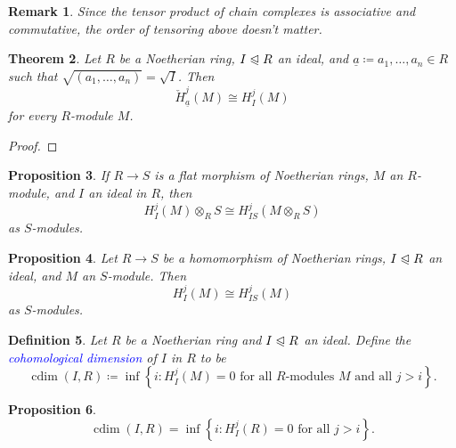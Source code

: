 \documentclass[10pt]{article}
\theoremstyle{thmstyle}
\newtheorem{theorem}{Theorem}[section]
\newtheorem{proposition}[theorem]{Proposition}
\theoremstyle{defstyle}
\newtheorem{definition}[theorem]{Definition}
\newtheorem{remark}[theorem]{Remark}
\newcommand{\define}[1]{\textcolor{blue}{\textit{#1}}}
\newcommand{\noreq}{\trianglelefteqslant}
\newcommand{\ul}[1]{\underline{#1}}
\newcommand{\cech}[1]{\mathbin{\check{#1}}}
\newcommand{\cdim}{\operatorname{cdim}}
\begin{document}
\begin{remark}
	Since the tensor product of chain complexes is associative and commutative, the order of tensoring above doesn't matter. 
\end{remark}

\begin{theorem}
	Let $R$ be a Noetherian ring, $I\noreq R$ an ideal, and $\ul a\coloneq a_1,\dots, a_n\in R$ such that $\sqrt{(a_1,\dots ,a_n)} = \sqrt I$. Then 
	\begin{equation*}
		\cech{H}^j_{\ul a}(M)\cong  H^j_I(M)
	\end{equation*}
	for every $R$-module $M$.
\end{theorem}
\begin{proof}
	
\end{proof}

\begin{proposition}
	If $R\to S$ is a flat morphism of Noetherian rings, $M$ an $R$-module, and $I$ an ideal in $R$, then 
	\begin{equation*}
		H^j_I(M)\otimes_R S\cong H^j_{IS}(M\otimes_R S)
	\end{equation*}
	as $S$-modules.
\end{proposition}

\begin{proposition}
	Let $R\to S$ be a homomorphism of Noetherian rings, $I\noreq R$ an ideal, and $M$ an $S$-module. Then 
	\begin{equation*}
		H^j_{I}(M)\cong H^j_{IS}(M)
	\end{equation*}
	as $S$-modules.
\end{proposition}

\begin{definition}
	Let $R$ be a Noetherian ring and $I\noreq R$ an ideal. Define the \define{cohomological dimension} of $I$ in $R$ to be 
	\begin{equation*}
		\cdim(I, R)\coloneq\inf\left\{i\colon H^j_I(M) = 0\text{ for all $R$-modules $M$ and all $j > i$}\right\}.
	\end{equation*}
\end{definition}

\begin{proposition}
	\begin{equation*}
		\cdim(I, R) = \inf\left\{i\colon H^j_I(R) = 0 \text{ for all }j > i\right\}.
	\end{equation*}
\end{proposition}
\end{document}
